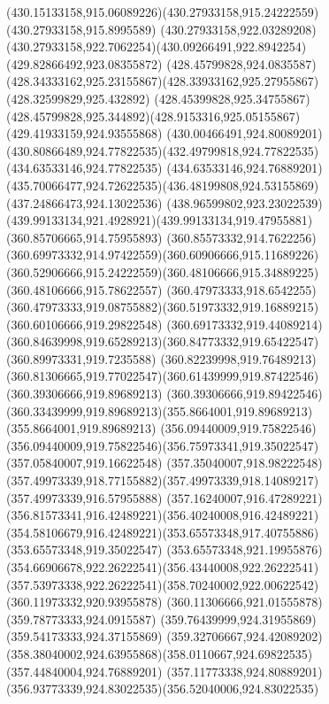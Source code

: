{{{{				\curveto(430.15133158,915.06089226)(430.27933158,915.24222559)(430.27933158,915.8995589)
				\lineto(430.27933158,922.03289208)
				\curveto(430.27933158,922.7062254)(430.09266491,922.8942254)(429.82866492,923.08355872)
				\curveto(428.45799828,924.0835587)(428.34333162,925.23155867)(428.33933162,925.27955867)
				\lineto(428.32599829,925.432892)
				\lineto(428.45399828,925.34755867)
				\curveto(428.45799828,925.344892)(428.9153316,925.05155867)(429.41933159,924.93555868)
				\curveto(430.00466491,924.80089201)(430.80866489,924.77822535)(432.49799818,924.77822535)
				\lineto(434.63533146,924.77822535)
				\lineto(434.63533146,924.76889201)
				\curveto(435.70066477,924.72622535)(436.48199808,924.53155869)(437.24866473,924.13022536)
				\curveto(438.96599802,923.23022539)(439.99133134,921.4928921)(439.99133134,919.47955881)
				\moveto(360.85706665,914.75955893)
				\curveto(360.85573332,914.7622256)(360.69973332,914.97422559)(360.60906666,915.11689226)
				\curveto(360.52906666,915.24222559)(360.48106666,915.34889225)(360.48106666,915.78622557)
				\lineto(360.47973333,918.6542255)
				\curveto(360.47973333,919.08755882)(360.51973332,919.16889215)(360.60106666,919.29822548)
				\curveto(360.69173332,919.44089214)(360.84639998,919.65289213)(360.84773332,919.65422547)
				\lineto(360.89973331,919.7235588)
				\lineto(360.82239998,919.76489213)
				\curveto(360.81306665,919.77022547)(360.61439999,919.87422546)(360.39306666,919.89689213)
				\lineto(360.39306666,919.89422546)
				\curveto(360.33439999,919.89689213)(355.8664001,919.89689213)(355.8664001,919.89689213)
				\lineto(356.09440009,919.75822546)
				\curveto(356.09440009,919.75822546)(356.75973341,919.35022547)(357.05840007,919.16622548)
				\curveto(357.35040007,918.98222548)(357.49973339,918.77155882)(357.49973339,918.14089217)
				\lineto(357.49973339,916.57955888)
				\curveto(357.16240007,916.47289221)(356.81573341,916.42489221)(356.40240008,916.42489221)
				\curveto(354.58106679,916.42489221)(353.65573348,917.40755886)(353.65573348,919.35022547)
				\curveto(353.65573348,921.19955876)(354.66906678,922.26222541)(356.43440008,922.26222541)
				\curveto(357.53973338,922.26222541)(358.70240002,922.00622542)(360.11973332,920.93955878)
				\lineto(360.11306666,921.01555878)
				\lineto(359.78773333,924.0915587)
				\lineto(359.76439999,924.31955869)
				\lineto(359.54173333,924.37155869)
				\lineto(359.32706667,924.42089202)
				\curveto(358.38040002,924.63955868)(358.0110667,924.69822535)(357.44840004,924.76889201)
				\curveto(357.11773338,924.80889201)(356.93773339,924.83022535)(356.52040006,924.83022535)
}}}}

